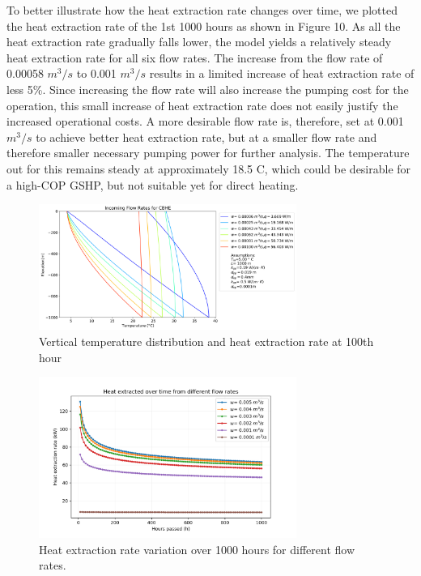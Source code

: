 		To better illustrate how the heat extraction rate changes over time, we plotted the heat extraction rate of the 1st 1000 hours as shown in Figure 10. As all the heat extraction rate gradually falls lower, the model yields a relatively steady heat extraction rate for all six flow rates. The increase from the flow rate of 0.00058 $m^3/s$ to 0.001 $m^3/s$ results in a limited increase of heat extraction rate of less 5\%. Since increasing the flow rate will also increase the pumping cost for the operation, this small increase of heat extraction rate does not easily justify the increased operational costs. A more desirable flow rate is, therefore, set at 0.001 $m^3/s$ to achieve better heat extraction rate, but at a smaller flow rate and therefore smaller necessary pumping power for further analysis. The temperature out for this remains steady at approximately 18.5 \degree C, which could be desirable for a high-COP GSHP, but not suitable yet for direct heating.
        \begin{figure}[h!]
            \centering
            \includegraphics[width=0.75\textwidth]{fr_1000_MIN.png}
            \caption{Vertical temperature distribution and heat extraction rate at 100th hour}
            \label{fig:frs}
        \end{figure}
        
        \begin{figure}[h!]
            \centering
            \includegraphics[width=0.75\textwidth]{HeatExtractHours.png}
            \caption{Heat extraction rate variation over 1000 hours for different flow rates.}
            \label{fig:frHR}
        \end{figure}    
